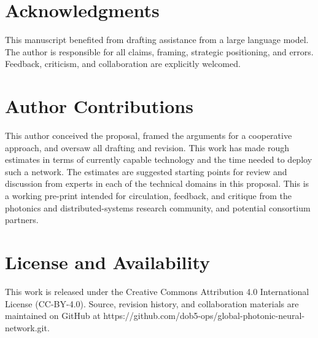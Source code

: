 \documentclass[12pt]{article}
\begin{document}
\section*{Acknowledgments}

This manuscript benefited from drafting assistance from a large language model. 
The author is responsible for all claims, framing,
strategic positioning, and errors. Feedback, criticism, and collaboration are
explicitly welcomed.

\section*{Author Contributions}

This author conceived the proposal, framed the arguments for a cooperative
approach, and oversaw all drafting and revision. This work has 
made rough estimates in terms of currently capable technology and the time needed to deploy such a network. 
The estimates are suggested starting points for review and discussion from experts in each of the technical domains in this proposal. This is a working pre-print intended for circulation, feedback, and critique from the 
photonics and distributed-systems research community, and potential consortium partners.

\section*{License and Availability}

This work is released under the Creative Commons Attribution 4.0 International
License (CC-BY-4.0). Source, revision history, and collaboration materials are
maintained on GitHub at https://github.com/dob5-ops/global-photonic-neural-network.git.
\end{document}

